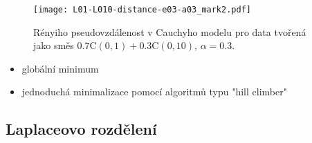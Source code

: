 \documentclass[11pt,a4paper]{beamer}
\begin{document}
\begin{frame}
	\begin{figure}
		\texttt{[image: L01-L010-distance-e03-a03\_mark2.pdf]}
		\caption{Rényiho pseudovzdálenost v Cauchyho modelu pro data tvořená jako směs $0.7\mathrm{C}(0,1) + 0.3\mathrm{C}(0,10)$, $\alpha = 0.3.$}
	\end{figure}
	\begin{itemize}
		\item globální minimum
		\item jednoduchá minimalizace pomocí algoritmů typu "hill climber"
	\end{itemize}
\end{frame}

\subsection{Laplaceovo rozdělení}    %
\end{document}
